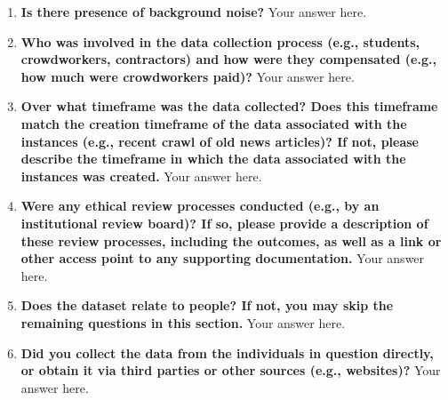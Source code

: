 \documentclass{article}
\begin{document}
\begin{enumerate}[leftmargin=0.65cm]
        \item \textbf{Is there presence of background noise?} 
        \newline 
        Your answer here.
        \newline 
        
        \item \textbf{Who was involved in the data collection process (e.g., students, crowdworkers, contractors) and how were they compensated (e.g., how much were crowdworkers paid)?}
        \newline 
        Your answer here.
        \newline 
        
        \item \textbf{Over what timeframe was the data collected? Does this timeframe match the creation timeframe of the data associated with the instances (e.g., recent crawl of old news articles)? If not, please describe the timeframe in which the data associated with the instances was created.}
        \newline 
        Your answer here.
        \newline 
        
        \item \textbf{Were any ethical review processes conducted (e.g., by an institutional review board)? If so, please provide a description of these review processes, including the outcomes, as well as a link or other access point to any supporting documentation.}
        \newline 
        Your answer here.
        \newline 
        
        \item \textbf{Does the dataset relate to people? If not, you may skip the remaining questions in this section.}
        \newline 
        Your answer here.
        \newline 
        
        \item \textbf{Did you collect the data from the individuals in question directly, or obtain it via third parties or other sources (e.g., websites)?}
        \newline 
        Your answer here.
        \newline 
        

\end{enumerate}
\end{document}
